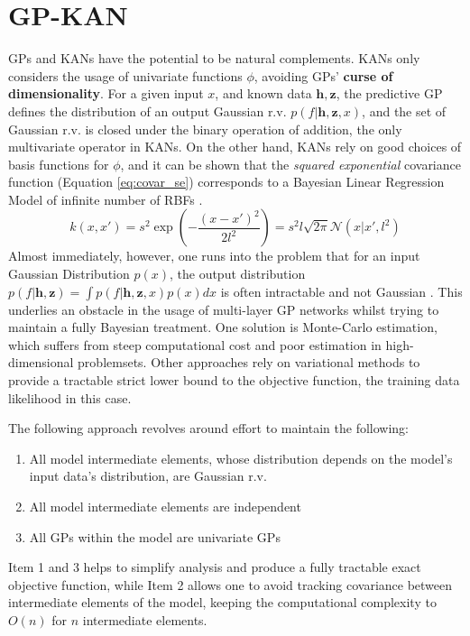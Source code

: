 \documentclass{article}
\begin{document}
\section{GP-KAN}
GPs and KANs have the potential to be natural complements. KANs only considers the usage of univariate functions $\phi$, avoiding GPs' \textbf{curse of dimensionality}. For a given input $x$, and known data $\boldsymbol{h}, \boldsymbol{z}$, the predictive GP defines the distribution of an output Gaussian r.v. $p(f|\boldsymbol{h},\boldsymbol{z},x)$, and the set of Gaussian r.v. is closed under the binary operation of addition, the only multivariate operator in KANs. On the other hand, KANs rely on good choices of basis functions for $\phi$, and it can be shown that the \textit{squared exponential} covariance function (Equation \ref{eq:covar_se}) corresponds to a Bayesian Linear Regression Model of infinite number of RBFs \cite[Sect 4.3 \& Eq 4.13]{GaussianProcess}.
\begin{equation}
    k(x,x')=s^2\exp\left(-\frac{(x-x')^2}{2l^2}\right)=s^2l\sqrt{2\pi}\mathcal{N}(x|x',l^2)
    \label{eq:covar_se}
\end{equation}
Almost immediately, however, one runs into the problem that for an input Gaussian Distribution $p(x)$, the output distribution $p(f|\boldsymbol{h},\boldsymbol{z})=\int p(f|\boldsymbol{h},\boldsymbol{z},x)p(x)dx$ is often intractable and not Gaussian \cite{deepGP, GPLVM}. This underlies an obstacle in the usage of multi-layer GP networks whilst trying to maintain a fully Bayesian treatment. One solution is Monte-Carlo estimation, which suffers from steep computational cost and poor estimation in high-dimensional problemsets. Other approaches \cite{deepGP} rely on variational methods to provide a tractable strict lower bound to the objective function, the training data likelihood in this case.

The following approach revolves around effort to maintain the following:
\begin{enumerate}
    \item All model intermediate elements, whose distribution depends on the model's input data's distribution, are Gaussian r.v.
    \item All model intermediate elements are independent
    \item All GPs within the model are univariate GPs
\end{enumerate}
Item 1 and 3 helps to simplify analysis and produce a fully tractable exact objective function, while Item 2 allows one to avoid tracking covariance between intermediate elements of the model, keeping the computational complexity to $O(n)$ for $n$ intermediate elements.
\end{document}
